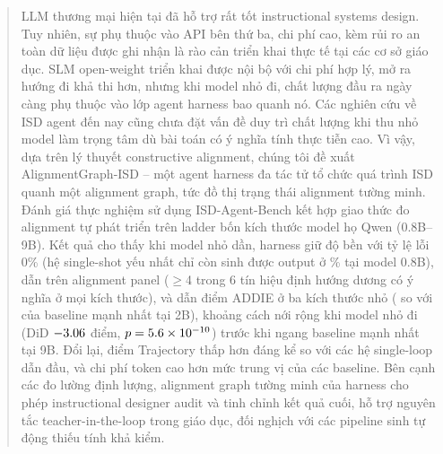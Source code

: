 \begin{abstract}
LLM thương mại hiện tại đã hỗ trợ rất tốt instructional systems design.
Tuy nhiên, sự phụ thuộc vào API bên thứ ba, chi phí cao, kèm rủi ro an toàn dữ liệu được ghi nhận là rào cản triển khai
thực tế tại các cơ sở giáo dục.
SLM open-weight triển khai được nội bộ với chi phí hợp lý, mở ra hướng đi khả thi hơn, nhưng khi model nhỏ
đi, chất lượng đầu ra ngày càng phụ thuộc vào lớp agent harness bao quanh nó.
Các nghiên cứu về ISD agent đến nay cũng chưa đặt vấn đề duy trì chất lượng khi thu nhỏ model làm trọng tâm dù bài toán
có ý nghĩa tính thực tiễn cao.
Vì vậy, dựa trên lý thuyết constructive alignment, chúng tôi đề xuất AlignmentGraph-ISD -- một agent harness đa tác tử tổ
chức quá trình ISD quanh một alignment graph, tức đồ thị trạng thái alignment tường minh.
Đánh giá thực nghiệm sử dụng ISD-Agent-Bench kết hợp giao thức đo alignment tự phát triển trên ladder bốn kích thước model
họ Qwen (0.8B--9B).
Kết quả cho thấy khi model nhỏ dần, harness giữ độ bền với tỷ lệ lỗi 0\% (hệ single-shot yếu nhất chỉ còn
sinh được output ở \costWorstCoveragePct\% tại model 0.8B), dẫn trên alignment panel ($\geq$4 trong 6 tín hiệu định hướng dương có ý
nghĩa ở mọi kích thước), và dẫn điểm ADDIE ở ba kích thước nhỏ (\rqOneHarnessAddieTwoB{} so với \rqOneBestBaselineAddieTwoB{} của baseline
mạnh nhất tại 2B), khoảng cách nới rộng khi model nhỏ đi (DiD $\rqOneDiDVsBestBaseline$ điểm,
$p=\rqOneDiDVsBestBaselineP$) trước khi ngang baseline mạnh nhất tại 9B.
Đổi lại, điểm Trajectory thấp hơn đáng kể so với các hệ single-loop dẫn đầu, và chi phí token cao hơn mức trung vị của các baseline.
Bên cạnh các đo lường định lượng, alignment graph tường minh của harness cho phép instructional designer
audit và tinh chỉnh kết quả cuối, hỗ trợ nguyên tắc teacher-in-the-loop trong giáo dục, đối nghịch với các pipeline
sinh tự động thiếu tính khả kiểm.
\end{abstract}
